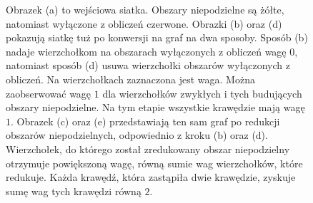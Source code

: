 \begin{figure}[h]
\begin{subfigure}{.5\textwidth}
    \caption[short]{}
\end{subfigure}
\begin{subfigure}{.5\textwidth}
    \centering
    \caption[short]{}
\end{subfigure}%
\begin{subfigure}{.5\textwidth}
    \centering
    \caption[short]{}
\end{subfigure}
\caption{Obrazek (a) to wejściowa siatka.
Obszary niepodzielne są żółte, natomiast wyłączone z obliczeń czerwone.
Obrazki (b) oraz (d) pokazują siatkę tuż po konwersji na graf na dwa sposoby.
Sposób (b) nadaje wierzchołkom na obszarach wyłączonych z obliczeń wagę $0$, natomiast sposób (d) usuwa wierzchołki obszarów
wyłączonych z obliczeń.
Na wierzchołkach zaznaczona jest waga.
Można zaobserwować wagę $1$ dla wierzchołków zwykłych i tych budujących obszary niepodzielne.
Na tym etapie wszystkie krawędzie mają wagę $1$. Obrazek (c) oraz (e) przedstawiają ten sam graf po redukcji obszarów
niepodzielnych, odpowiednio z kroku (b) oraz (d).
Wierzchołek, do którego został zredukowany obszar niepodzielny otrzymuje powiększoną wagę, równą sumie wag wierzchołków, które
redukuje. Każda krawędź, która zastąpiła dwie krawędzie, zyskuje sumę wag tych krawędzi równą $2$.}
\label{im:indivisible}
\end{figure}

\FloatBarrier


